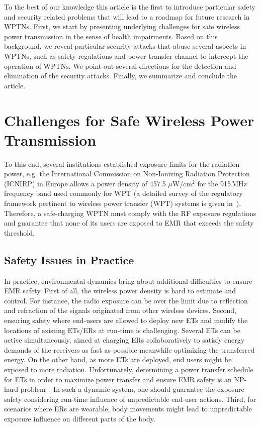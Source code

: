 \documentclass[journal,10pt,draftclsnofoot,onecolumn]{IEEEtran}
\begin{document}
To the best of our knowledge this article is the first to introduce particular safety and security related problems that will lead to a roadmap for future research in WPTNs. First, we start by presenting underlying challenges for safe wireless power transmission in the sense of health impairments. Based on this background, we reveal particular security attacks that abuse several aspects in WPTNs, such as safety regulations and power transfer channel to intercept the operation of WPTNs. We point out several directions for the detection and elimination of the security attacks. Finally, we summarize and conclude the article.

\section{Challenges for Safe Wireless Power Transmission}
\label{sec:Safety}



To this end, several institutions established exposure limits for the radiation power, e.g. the International Commission on Non-Ionizing Radiation Protection (ICNIRP) in Europe allows a power density of 457.5 $\mu$W/cm$^{\text{2}}$ for the 915\,MHz frequency band used commonly for WPT (a detailed survey of the regulatory framework pertinent to wireless power transfer (WPT) systems is given in~\cite{kalialakis2014wpt}). Therefore, a safe-charging WPTN must comply with the RF exposure regulations and guarantee that none of its users are exposed to EMR that exceeds the safety threshold. 

\subsection{Safety Issues in Practice}
\label{subsec:safety issues}

In practice, environmental dynamics bring about additional difficulties to ensure EMR safety. First of all, the wireless power density is hard to estimate and control. For instance, the radio exposure can be over the limit due to reflection and refraction of the signals originated from other wireless devices. Second, ensuring safety where end-users are allowed to deploy new ETs and modify the locations of existing ETs/ERs at run-time is challenging. Several ETs can be active simultaneously, aimed at charging ERs collaboratively to satisfy energy demands of the receivers as fast as possible meanwhile optimizing the transferred energy. On the other hand, as more ETs are deployed, end users might be exposed to more radiation. Unfortunately, determining a power transfer schedule for ETs in order to maximize power transfer and ensure EMR safety is an NP-hard problem~\cite{dai_infocom_2014}. In such a dynamic system, one should guarantee the exposure safety considering run-time influence of unpredictable end-user actions. Third, for scenarios where ERs are wearable, body movements might lead to unpredictable exposure influence on different parts of the body.
\end{document}
